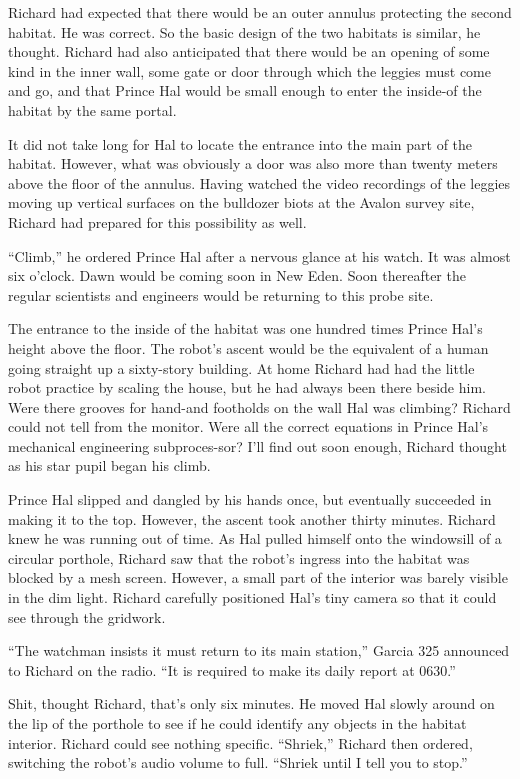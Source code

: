 \documentclass[]{article}
\begin{document}
{Richard had expected that there would be an outer annulus protecting the second habitat. He was correct. So the basic design of the two habitats is similar, he thought. Richard had also anticipated that there would be an opening of some kind in the inner wall, some gate or door through which the leggies must come and go, and that Prince Hal would be small enough to enter the inside-of the habitat by the same portal.

It did not take long for Hal to locate the entrance into the main part of the habitat. However, what was obviously a door was also more than twenty meters above the floor of the annulus. Having watched the video recordings of the leggies moving up vertical surfaces on the bulldozer biots at the Avalon survey site, Richard had prepared for this possibility as well.

“Climb,” he ordered Prince Hal after a nervous glance at his watch. It was almost six o’clock. Dawn would be coming soon in New Eden. Soon thereafter the regular scientists and engineers would be returning to this probe site.

The entrance to the inside of the habitat was one hundred times Prince Hal’s height above the floor. The robot’s ascent would be the equivalent of a human going straight up a sixty-story building. At home Richard had had the little robot practice by scaling the house, but he had always been there beside him. Were there grooves for hand-and footholds on the wall Hal was climbing? Richard could not tell from the monitor. Were all the correct equations in Prince Hal’s mechanical engineering subproces-sor? I’ll find out soon enough, Richard thought as his star pupil began his climb.

Prince Hal slipped and dangled by his hands once, but eventually succeeded in making it to the top. However, the ascent took another thirty minutes. Richard knew he was running out of time. As Hal pulled himself onto the windowsill of a circular porthole, Richard saw that the robot’s ingress into the habitat was blocked by a mesh screen. However, a small part of the interior was barely visible in the dim light. Richard carefully positioned Hal’s tiny camera so that it could see through the gridwork.

“The watchman insists it must return to its main station,” Garcia 325 announced to Richard on the radio. “It is required to make its daily report at 0630.”

Shit, thought Richard, that’s only six minutes. He moved Hal slowly around on the lip of the porthole to see if he could identify any objects in the habitat interior. Richard could see nothing specific. “Shriek,” Richard then ordered, switching the robot’s audio volume to full. “Shriek until I tell you to stop.”

}
\end{document}
